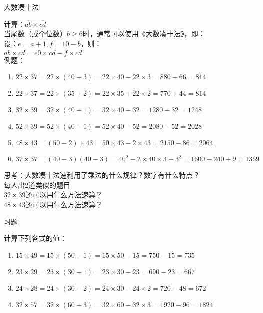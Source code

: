 \documentclass[aspectratio=169]{ctexbeamer} %
\date{\today}
\begin{document}
\begin{frame}[t]{大数凑十法}
\begin{spacing}{1.2}
\normalsize
计算：$\overline{ab} \times \overline{cd}$ \\
当尾数（或个位数）$b \ge 6$时，通常可以使用《大数凑十法》，即：\\
设：$e = a+1, f = 10-b$，则：\\
$\overline{ab} \times \overline{cd} = \overline{e0} \times \overline{cd} - \overline{f} \times \overline{cd}$ \\
例题：
\begin{enumerate}[label={\arabic*.}]
\item $22 \times 37  = 22 \times (40-3) = 22 \times 40 - 22 \times 3 = 880 - 66 = 814$
\item $22 \times 37  = 22 \times (35+2) = 22 \times 35 + 22 \times 2 = 770 + 44 = 814$
\item $32 \times 39  = 32 \times (40-1)=32 \times 40 - 32=1280-32=1248$
\item $52 \times 39  = 52 \times (40-1)=52 \times 40 - 52=2080-52=2028$
\item $48 \times 43  = (50-2) \times 43=50 \times 43 - 2 \times 43=2150-86=2064$
\item $37 \times 37  = (40-3)(40-3)=40^2 - 2\times40\times3 +3^2=1600-240+9=1369$

\end{enumerate}
\alert{思考：大数凑十法速利用了乘法的什么规律？数字有什么特点？}\\
\alert{每人出2道类似的题目}  \\
\alert{$32 \times 39 $还可以用什么方法速算？} \\
\alert{$48 \times 43 $还可以用什么方法速算？}
\end{spacing}
\end{frame}

\begin{frame}[t]{习题}
\begin{spacing}{1.2}
\normalsize
计算下列各式的值：
\begin{enumerate}[label={\arabic*.}]
\item $15 \times 49  = 15 \times (50-1) = 15 \times 50 - 15 = 750 - 15 = 735$
\item $23 \times 29  = 23 \times (30-1) = 23 \times 30 - 23 = 690 - 23 = 667$
\item $24 \times 28  = 24 \times (30-2) = 24 \times 30 - 24 \times 2 = 720 - 48 = 672$
\item $32 \times 57  = 32 \times (60-3) = 32 \times 60 - 32 \times 3 = 1920 - 96 = 1824$
\end{enumerate}

\end{spacing}
\end{frame}
\end{document}

